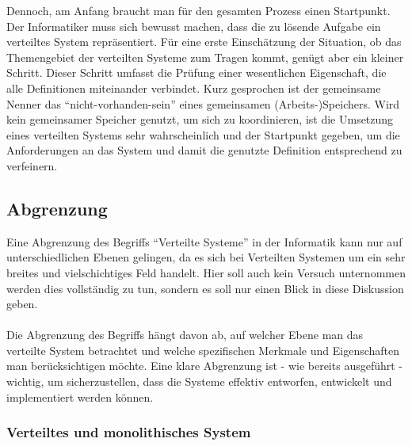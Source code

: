 \documentclass[../vs-script-first-v01.tex]{subfiles}
\begin{document}
Dennoch, am Anfang braucht man für den gesamten Prozess einen Startpunkt. Der Informatiker muss sich bewusst machen, dass die zu lösende Aufgabe ein verteiltes System repräsentiert. Für eine erste Einschätzung der Situation, ob das Themengebiet der verteilten Systeme zum Tragen kommt, genügt aber ein kleiner Schritt. Dieser Schritt umfasst die Prüfung einer wesentlichen Eigenschaft, die alle Definitionen miteinander verbindet.  Kurz gesprochen ist der gemeinsame Nenner das \enquote{nicht-vorhanden-sein} eines gemeinsamen (Arbeits-)Speichers. Wird kein gemeinsamer Speicher genutzt, um sich zu koordinieren, ist die Umsetzung eines verteilten Systems sehr wahrscheinlich und der Startpunkt gegeben, um die Anforderungen an das System und damit die genutzte Definition entsprechend zu verfeinern.
\subsection{Abgrenzung}
Eine Abgrenzung des Begriffs \enquote{Verteilte Systeme} in der Informatik kann nur auf unterschiedlichen Ebenen gelingen, da es sich bei Verteilten Systemen um ein sehr breites und vielschichtiges Feld handelt. Hier soll auch kein Versuch unternommen werden dies vollständig zu tun, sondern es soll nur einen Blick in diese Diskussion geben.
\\\\
Die Abgrenzung des Begriffs hängt davon ab, auf welcher Ebene man das verteilte System betrachtet und welche spezifischen Merkmale und Eigenschaften man berücksichtigen möchte. Eine klare Abgrenzung ist - wie bereits ausgeführt - wichtig, um sicherzustellen, dass die Systeme effektiv entworfen, entwickelt und implementiert werden können.

\subsubsection{Verteiltes und monolithisches System}
\end{document}
